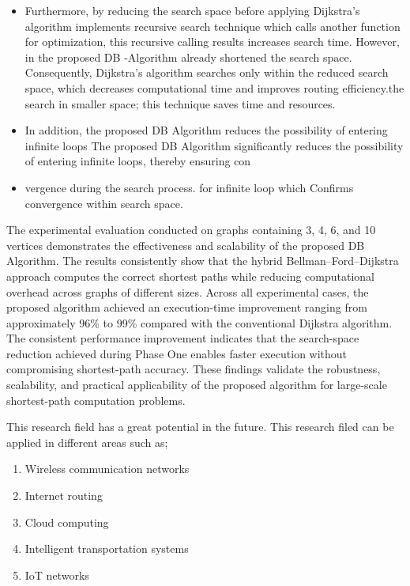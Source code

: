\documentclass[10pt]{NSP1}
\begin{document}
\begin{itemize}
  \item Furthermore, by reducing the search space before applying Dijkstra's algorithm implements recursive search technique which calls another function for optimization, this recursive calling results increases search time. However, in the proposed DB -Algorithm already shortened the search space. Consequently, Dijkstra's algorithm searches only within the reduced search space, which decreases computational time and improves routing efficiency.the search in smaller space; this technique saves time and resources.
  \item In addition, the proposed DB Algorithm reduces the possibility of entering infinite loops The proposed DB Algorithm significantly reduces the possibility of entering infinite loops, thereby ensuring con
  \item vergence during the search process. for infinite loop which Confirms convergence within search space.
\end{itemize}

The experimental evaluation conducted on graphs containing 3, 4, 6, and 10 vertices demonstrates the effectiveness and scalability of the proposed DB Algorithm. The results consistently show that the hybrid Bellman–Ford–Dijkstra approach computes the correct shortest paths while reducing computational overhead across graphs of different sizes. Across all experimental cases, the proposed algorithm achieved an execution-time improvement ranging from approximately 96\% to 99\% compared with the conventional Dijkstra algorithm. The consistent performance improvement indicates that the search-space reduction achieved during Phase One enables faster execution without compromising shortest-path accuracy. These findings validate the robustness, scalability, and practical applicability of the proposed algorithm for large-scale shortest-path computation problems.

\par\medskip{}\smallskip

This research field has a great potential in the future. This research filed can be applied in different areas such as;

\begin{enumerate}
  \item Wireless communication networks
  \item Internet routing
  \item Cloud computing
  \item Intelligent transportation systems
  \item IoT networks
\end{enumerate}
\end{document}
